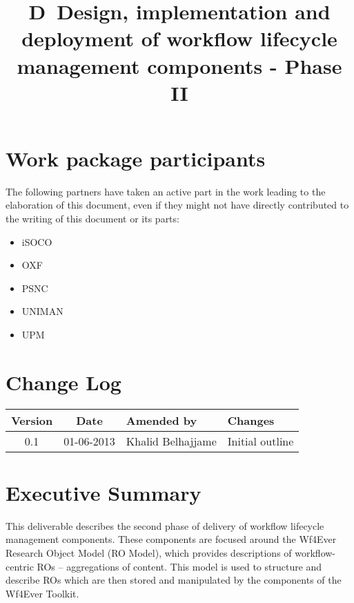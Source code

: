 \documentclass[a4paper, twoside, 11pt]{article}
\title{D\delid\ Design, implementation and deployment of workflow
  lifecycle management components - Phase II}
\begin{document}
\maketitle


\section*{Work package participants} The following partners have taken an active part in the work leading to the elaboration of this document, even if they might not have directly contributed to the writing of this document or its parts: %
\begin{itemize}
\item iSOCO
\item OXF
\item PSNC
\item UNIMAN
\item UPM
\end{itemize}

\section*{Change Log}
\begin{centering}

\begin{tabular}{|c|c|p{4.92cm}|p{6.5cm}|}

\hline \textbf{Version} & \textbf{Date} & \textbf{Amended by} & \textbf{Changes} \\ \hline
0.1 & 01-06-2013 & Khalid Belhajjame & Initial outline \\ \hline

\end{tabular}

\end{centering}
\clearpage
\section*{Executive Summary}
This deliverable describes the second phase of delivery of workflow
lifecycle management components. These components are focused around
the Wf4Ever Research Object Model (RO Model), which provides
descriptions of workflow-centric ROs -- aggregations of content. This
model is used to structure and describe ROs which are then stored and
manipulated by the components of the Wf4Ever Toolkit.
\end{document}

